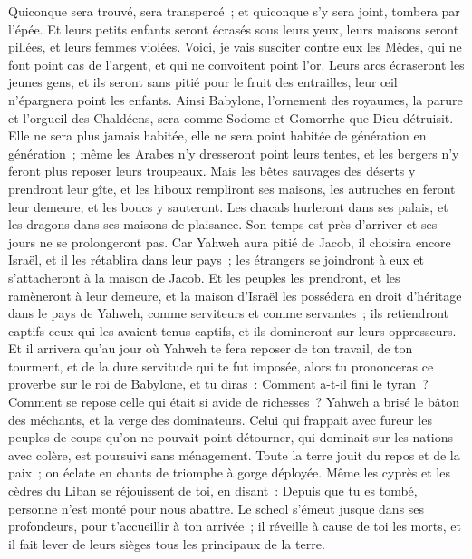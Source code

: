 \begin{multicols}{2}
Quiconque sera trouvé, sera transpercé~; et quiconque s'y sera joint, tombera par l'épée.
Et leurs petits enfants seront écrasés sous leurs yeux, leurs maisons seront pillées, et leurs femmes violées.
Voici, je vais susciter contre eux les Mèdes, qui ne font point cas de l'argent, et qui ne convoitent point l'or.
Leurs arcs écraseront les jeunes gens, et ils seront sans pitié pour le fruit des entrailles, leur œil n'épargnera point les enfants.
Ainsi Babylone, l'ornement des royaumes, la parure et l'orgueil des Chaldéens, sera comme Sodome et Gomorrhe que Dieu détruisit.
Elle ne sera plus jamais habitée, elle ne sera point habitée de génération en génération~; même les Arabes n'y dresseront point leurs tentes, et les bergers n'y feront plus reposer leurs troupeaux.
Mais les bêtes sauvages des déserts y prendront leur gîte, et les hiboux rempliront ses maisons, les autruches en feront leur demeure, et les boucs y sauteront.
Les chacals hurleront dans ses palais, et les dragons dans ses maisons de plaisance. Son temps est près d'arriver et ses jours ne se prolongeront pas.
\VerseOne{}Car Yahweh aura pitié de Jacob, il choisira encore Israël, et il les rétablira dans leur pays~; les étrangers se joindront à eux et s'attacheront à la maison de Jacob.
Et les peuples les prendront, et les ramèneront à leur demeure, et la maison d'Israël les possédera en droit d'héritage dans le pays de Yahweh, comme serviteurs et comme servantes~; ils retiendront captifs ceux qui les avaient tenus captifs, et ils domineront sur leurs oppresseurs.
Et il arrivera qu'au jour où Yahweh te fera reposer de ton travail, de ton tourment, et de la dure servitude qui te fut imposée,
alors tu prononceras ce proverbe sur le roi de Babylone, et tu diras~: Comment a-t-il fini le tyran~? Comment se repose celle qui était si avide de richesses~?
Yahweh a brisé le bâton des méchants, et la verge des dominateurs.
Celui qui frappait avec fureur les peuples de coups qu'on ne pouvait point détourner, qui dominait sur les nations avec colère, est poursuivi sans ménagement.
Toute la terre jouit du repos et de la paix~; on éclate en chants de triomphe à gorge déployée.
Même les cyprès et les cèdres du Liban se réjouissent de toi, en disant~: Depuis que tu es tombé, personne n'est monté pour nous abattre.
Le scheol s'émeut jusque dans ses profondeurs, pour t'accueillir à ton arrivée~; il réveille à cause de toi les morts, et il fait lever de leurs sièges tous les principaux de la terre.

\end{multicols}
